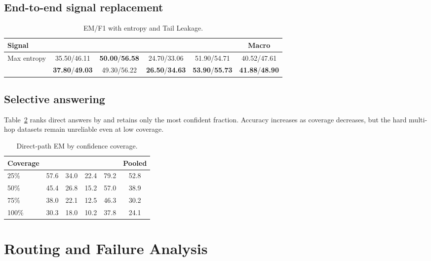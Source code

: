 \subsection{End-to-end signal replacement}

\begin{table}[h]
\caption{EM/F1 with entropy and Tail Leakage.}
\label{tab:entropy-vs-tail}
\centering
\scriptsize
\setlength{\tabcolsep}{3.5pt}
\begin{tabular}{lccccc}
\toprule
Signal & \hotpot{} & \twowiki{} & \musique{} & \popqa{} & Macro \\
\midrule
Max entropy & 35.50/46.11 & \textbf{50.00}/\textbf{56.58} & 24.70/33.06 & 51.90/54.71 & 40.52/47.61 \\
\tailleak{} & \textbf{37.80}/\textbf{49.03} & 49.30/56.22 & \textbf{26.50}/\textbf{34.63} & \textbf{53.90}/\textbf{55.73} & \textbf{41.88}/\textbf{48.90} \\
\bottomrule
\end{tabular}
\end{table}

\subsection{Selective answering}

Table~\ref{tab:selective} ranks direct answers by \tailleak{} and retains only
the most confident fraction. Accuracy increases as coverage decreases, but the
hard multi-hop datasets remain unreliable even at low coverage.

\begin{table}[h]
\caption{Direct-path EM by confidence coverage.}
\label{tab:selective}
\centering
\small
\setlength{\tabcolsep}{6pt}
\begin{tabular}{lccccc}
\toprule
Coverage & \hotpot{} & \twowiki{} & \musique{} & \popqa{} & Pooled \\
\midrule
25\% & 57.6 & 34.0 & 22.4 & 79.2 & 52.8 \\
50\% & 45.4 & 26.8 & 15.2 & 57.0 & 38.9 \\
75\% & 38.0 & 22.1 & 12.5 & 46.3 & 30.2 \\
100\% & 30.3 & 18.0 & 10.2 & 37.8 & 24.1 \\
\bottomrule
\end{tabular}
\end{table}

\section{Routing and Failure Analysis}
\label{app:routing}

